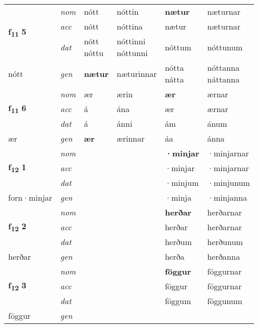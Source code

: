 \begin{longtable}[l]{X>{\footnotesize\itshape}XXXXX}
\multirow{3}{*}{{{\textbf{f{\textsubscript{11}}} \Large{\textbf{5}}}}} & nom & nótt & nóttin & \textbf{nætur} & næturnar \\*
 & acc & nótt & nóttina & nætur & næturnar \\*
 & dat & \specialcell{nótt\\ nóttu} & \specialcell{nóttinni\\ nóttunni} & nóttum & nóttunum \\*
 {\footnotesize{nótt}} & gen & \textbf{nætur} & næturinnar & \specialcell{nótta\\ nátta} & \specialcell{nóttanna\\ náttanna} \\
\cmidrule{1-6}

\multirow{3}{*}{{{\textbf{f{\textsubscript{11}}} \Large{\textbf{6}}}}} & nom & ær & ærin & \textbf{ær} & ærnar \\*
 & acc & á & ána & ær & ærnar \\*
 & dat & á & ánni & ám & ánum \\*
 {\footnotesize{ær}} & gen & \textbf{ær} & ærinnar & áa & ánna \\


\multirow{3}{*}{{{\textbf{f{\textsubscript{12}}} \Large{\textbf{1}}}}} & nom &  &  & \textbf{·minjar} & ·minjarnar \\*
 & acc &  &  & ·minjar & ·minjarnar \\*
 & dat &  &  & ·minjum & ·minjunum \\*
 {\footnotesize{forn\allowbreak ·minjar}} & gen & \textbf{} &  & ·minja & ·minjanna \\
\cmidrule{1-6}

\multirow{3}{*}{{{\textbf{f{\textsubscript{12}}} \Large{\textbf{2}}}}} & nom &  &  & \textbf{herðar} & herðarnar \\*
 & acc &  &  & herðar & herðarnar \\*
 & dat &  &  & herðum & herðunum \\*
 {\footnotesize{herðar}} & gen & \textbf{} &  & herða & herðanna \\
\cmidrule{1-6}

\multirow{3}{*}{{{\textbf{f{\textsubscript{12}}} \Large{\textbf{3}}}}} & nom &  &  & \textbf{föggur} & föggurnar \\*
 & acc &  &  & föggur & föggurnar \\*
 & dat &  &  & föggum & föggunum \\*
 {\footnotesize{föggur}} & gen & \textbf{} &  &  &  \\
\cmidrule{1-6}


\end{longtable}
